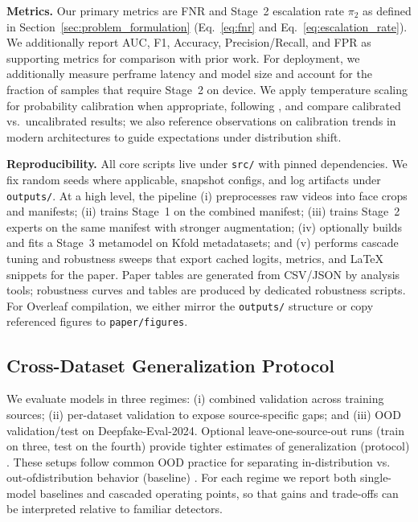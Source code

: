\textbf{Metrics.} Our primary metrics are FNR and Stage~2 escalation rate $\pi_2$ as defined in Section~\ref{sec:problem_formulation} (Eq.~\ref{eq:fnr} and Eq.~\ref{eq:escalation_rate}). We additionally report AUC, F1, Accuracy, Precision/Recall, and FPR as supporting metrics for comparison with prior work. For deployment, we additionally measure per\-frame latency and model size and account for the fraction of samples that require Stage~2 on device. We apply temperature scaling for probability calibration when appropriate, following \cite{guo2017calibration}, and compare calibrated vs.\ uncalibrated results; we also reference observations on calibration trends in modern architectures \cite{minderer2021revisiting} to guide expectations under distribution shift.

\textbf{Reproducibility.} All core scripts live under \verb|src/| with pinned dependencies. We fix random seeds where applicable, snapshot configs, and log artifacts under \verb|outputs/|. At a high level, the pipeline (i) preprocesses raw videos into face crops and manifests; (ii) trains Stage~1 on the combined manifest; (iii) trains Stage~2 experts on the same manifest with stronger augmentation; (iv) optionally builds and fits a Stage~3 meta\-model on K\-fold meta\-datasets; and (v) performs cascade tuning and robustness sweeps that export cached logits, metrics, and LaTeX snippets for the paper. Paper tables are generated from CSV/JSON by analysis tools; robustness curves and tables are produced by dedicated robustness scripts. For Overleaf compilation, we either mirror the \verb|outputs/| structure or copy referenced figures to \verb|paper/figures|.

\subsection*{Cross-Dataset Generalization Protocol}
We evaluate models in three regimes: (i) combined validation across training sources; (ii) per\hyp dataset validation to expose source\hyp specific gaps; and (iii) OOD validation/test on Deepfake\hyp Eval\hyp 2024. Optional leave\hyp one\hyp source\hyp out runs (train on three, test on the fourth) provide tighter estimates of generalization (protocol) \cite{wilddeepfake2021}. These setups follow common OOD practice for separating in\hyp distribution vs. out\hyp of\-distribution behavior (baseline) \cite{hendrycks2017baseline}. For each regime we report both single\hyp model baselines and cascaded operating points, so that gains and trade\hyp offs can be interpreted relative to familiar detectors.

